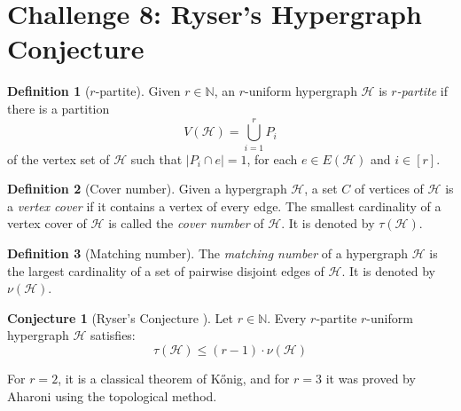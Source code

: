 \documentclass[12pt]{article}
\numberwithin{equation}{section}
\theoremstyle{definition}
\newtheorem{definition}{Definition}
\newtheorem{conjecture}[theorem]{Conjecture}
\newcommand{\ev}[1]{( #1 )}
\begin{document}
\section*{Challenge 8: Ryser's Hypergraph Conjecture}

\begin{definition}[$r$-partite]
Given $r\in \mathbb{N}$, an $r$-uniform hypergraph $\mathcal{H}$ is \emph{$r$-partite} if there is a partition
$$
V\ev{\mathcal{H}} = \bigcup_{i=1}^{r} P_i
$$
of the vertex set of $\mathcal{H}$ such that $|P_i \cap e| = 1$, for each $e\in E\ev{\mathcal{H}}$ and $i\in [r]$. 
\end{definition}

\begin{definition}[Cover number]
Given a hypergraph $\mathcal{H}$, a
set $C$ of vertices of $\mathcal{H}$ is a \textit{vertex cover} if it contains a vertex of every edge. The smallest cardinality of a vertex cover of $\mathcal{H}$ is called the \textit{cover number} of $\mathcal{H}$. It is denoted by $\tau(\mathcal{H})$.
\end{definition}

\begin{definition}[Matching number]
The \textit{matching number} of a hypergraph $\mathcal{H}$ is the largest cardinality of a set of pairwise disjoint edges of $\mathcal{H}$. It is denoted by $\nu\ev{\mathcal{H}}$.
\end{definition}

\begin{conjecture}[Ryser's Conjecture \mbox{\cite{bishnoi}}]
Let $r\in \mathbb{N}$.
Every $r$-partite $r$-uniform hypergraph $\mathcal{H}$ satisfies:
$$
\tau\ev{\mathcal{H}} \leq \ev{r-1} \cdot \nu\ev{\mathcal{H}}
$$

\end{conjecture}

For $r=2$, it is a classical theorem of K\H{o}nig, and for $r=3$ it was proved by Aharoni \cite{AharoniRyserTripartite} using the topological method. 

\printbibliography
\end{document}
